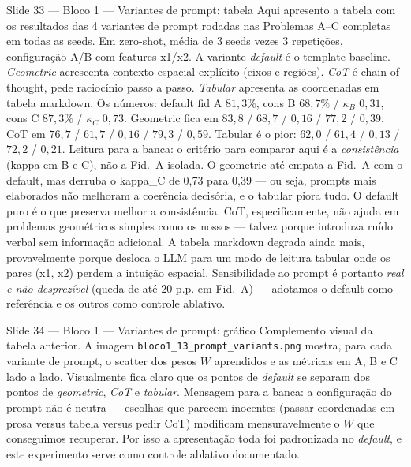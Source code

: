 \documentclass[aspectratio=169,10pt]{beamer}
\begin{document}
\begin{frame}{Slide 33 --- Bloco 1 --- Variantes de prompt: tabela}
\footnotesize
Aqui apresento a tabela com os resultados das 4 variantes de prompt rodadas nas Problemas A--C completas em todas as seeds. Em zero-shot, m\'edia de 3 seeds vezes 3 repeti\c{c}\~oes, configura\c{c}\~ao A/B com features x1/x2. A variante \emph{default} \'e o template baseline. \emph{Geometric} acrescenta contexto espacial expl\'icito (eixos e regi\~oes). \emph{CoT} \'e chain-of-thought, pede racioc\'inio passo a passo. \emph{Tabular} apresenta as coordenadas em tabela markdown. Os n\'umeros: default fid A $81{,}3\%$, cons B $68{,}7\%$ / $\kappa_B$ $0{,}31$, cons C $87{,}3\%$ / $\kappa_C$ $0{,}73$. Geometric fica em $83{,}8$ / $68{,}7$ / $0{,}16$ / $77{,}2$ / $0{,}39$. CoT em $76{,}7$ / $61{,}7$ / $0{,}16$ / $79{,}3$ / $0{,}59$. Tabular \'e o pior: $62{,}0$ / $61{,}4$ / $0{,}13$ / $72{,}2$ / $0{,}21$. Leitura para a banca: o crit\'erio para comparar aqui \'e a \emph{consist\^encia} (kappa em B e C), n\~ao a Fid.\ A isolada. O geometric at\'e empata a Fid.\ A com o default, mas derruba o kappa\_C de 0,73 para 0,39 --- ou seja, prompts mais elaborados n\~ao melhoram a coer\^encia decis\'oria, e o tabular piora tudo. O default puro \'e o que preserva melhor a consist\^encia. CoT, especificamente, n\~ao ajuda em problemas geom\'etricos simples como os nossos --- talvez porque introduza ru\'ido verbal sem informa\c{c}\~ao adicional. A tabela markdown degrada ainda mais, provavelmente porque desloca o LLM para um modo de leitura tabular onde os pares (x1, x2) perdem a intui\c{c}\~ao espacial. Sensibilidade ao prompt \'e portanto \emph{real e n\~ao desprez\'ivel} (queda de at\'e $20$ p.p. em Fid.\ A) --- adotamos o default como refer\^encia e os outros como controle ablativo.
\end{frame}

\begin{frame}{Slide 34 --- Bloco 1 --- Variantes de prompt: gr\'afico}
\footnotesize
Complemento visual da tabela anterior. A imagem \texttt{bloco1\_13\_prompt\_variants.png} mostra, para cada variante de prompt, o scatter dos pesos $W$ aprendidos e as m\'etricas em A, B e C lado a lado. Visualmente fica claro que os pontos de \emph{default} se separam dos pontos de \emph{geometric}, \emph{CoT} e \emph{tabular}. Mensagem para a banca: a configura\c{c}\~ao do prompt n\~ao \'e neutra --- escolhas que parecem inocentes (passar coordenadas em prosa versus tabela versus pedir CoT) modificam mensuravelmente o $W$ que conseguimos recuperar. Por isso a apresenta\c{c}\~ao toda foi padronizada no \emph{default}, e este experimento serve como controle ablativo documentado.
\end{frame}
\end{document}
